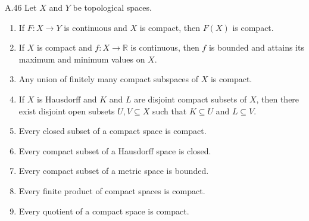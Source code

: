 \begin{exercise}{A.46}
    Let \(X\) and \(Y\) be topological spaces.

    \begin{enumerate}[itemsep=0pt,label={(\alph*)}]
        \item If \(F: X \to Y\) is continuous and \(X\) is compact, then \(F(X)\) is compact.

        \item If \(X\) is compact and \(f: X \to \mathbb{R}\) is continuous, then \(f\) is bounded and attains its maximum and minimum values on \(X\).

        \item Any union of finitely many compact subspaces of \(X\) is compact.

        \item If \(X\) is Hausdorff and \(K\) and \(L\) are disjoint compact subsets of \(X\), then there exist disjoint open subsets \(U, V \subseteq X\) such that \(K \subseteq U\) and \(L \subseteq V\).

        \item Every closed subset of a compact space is compact.

        \item Every compact subset of a Hausdorff space is closed.

        \item Every compact subset of a metric space is bounded.

        \item Every finite product of compact spaces is compact.

        \item Every quotient of a compact space is compact.
    \end{enumerate}
\end{exercise}


